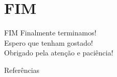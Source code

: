 \documentclass{libs/ufc_format}
\begin{document}
\section{FIM}

\begin{frame}{FIM}
    \centering
    \LARGE
    Finalmente terminamos!\\
    Espero que tenham gostado!\\
    \vspace{1cm}
    Obrigado pela atenção e paciência!
\end{frame}

\begin{frame}[allowframebreaks]{Referências}
    \scriptsize
    \printbibliography
\end{frame}
\end{document}
